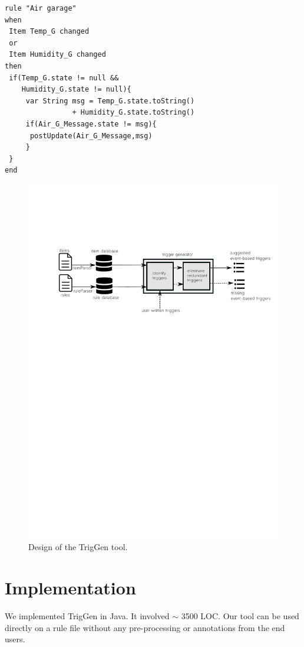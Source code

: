\documentclass{sig-alternate-05-2015}
\begin{document}
\begin{lstlisting}[caption={Rule for updating the status message for the air quality in the garage.},label={lst:conflict}]
rule "Air garage"
when
 Item Temp_G changed
 or
 Item Humidity_G changed
then
 if(Temp_G.state != null && 
    Humidity_G.state != null){
     var String msg = Temp_G.state.toString()
                + Humidity_G.state.toString()
     if(Air_G_Message.state != msg){
      postUpdate(Air_G_Message,msg)
     }
 }
end
\end{lstlisting}

\begin{figure}
\centering
\includegraphics [trim=0cm 18cm 0 5cm, scale=0.8]{images/design.pdf}
\caption{Design of the TrigGen tool.}
\label{fig:design}
\end{figure} 

\section{Implementation}
We implemented TrigGen in Java. It involved $\sim$ 3500 LOC. Our tool can be used directly on a rule file without any pre-processing or annotations from the end users. 
\end{document}

